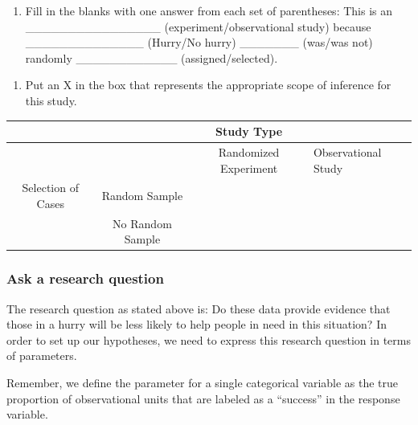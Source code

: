 \documentclass[
]{report}
\providecommand{\tightlist}{%
  \setlength{\itemsep}{0pt}\setlength{\parskip}{0pt}}
\begin{document}
\vspace{0.2in}


\begin{enumerate}
\def\labelenumi{\arabic{enumi}.}
\setcounter{enumi}{2}
\tightlist
\item
  Fill in the blanks with one answer from each set of parentheses: This is an\\
  \_\_\_\_\_\_\_\_\_\_\_\_\_\_\_\_ (experiment/observational study) because\\
  \_\_\_\_\_\_\_\_\_\_\_\_\_\_ (Hurry/No hurry) \_\_\_\_\_\_\_ (was/was not)\\
  randomly \_\_\_\_\_\_\_\_\_\_\_\_ (assigned/selected).
\end{enumerate}

\vspace{0.1in}

\begin{enumerate}
\def\labelenumi{\arabic{enumi}.}
\setcounter{enumi}{3}
\tightlist
\item
  Put an X in the box that represents the appropriate scope of inference for this study.
\end{enumerate}

\begin{longtable}[]{@{}cccl@{}}
\toprule
& & Study Type & \\
\midrule
\endhead
& & Randomized Experiment & Observational Study \\
Selection of Cases & Random Sample & & \\
& No Random Sample & & \\
\bottomrule
\end{longtable}


\hypertarget{ask-a-research-question-1}{%
\subsubsection*{Ask a research question}\label{ask-a-research-question-1}}

The research question as stated above is: Do these data provide evidence that those in a hurry will be less likely to help people in need in this situation? In order to set up our hypotheses, we need to express this research question in terms of parameters.

Remember, we define the parameter for a single categorical variable as the true proportion of observational units that are labeled as a ``success'' in the response variable.
\end{document}
